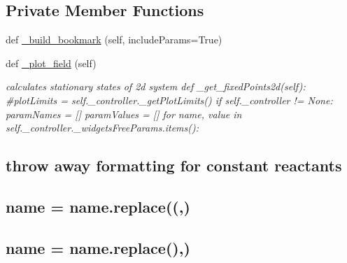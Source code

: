 \subsection*{Private Member Functions}
\begin{DoxyCompactItemize}
\item 
def \hyperlink{class_mu_mo_t_1_1_mu_mo_t_1_1_mu_mo_tfield_view_a5c6b66d66c612913bd40da54e1a50a83}{\+\_\+build\+\_\+bookmark} (self, include\+Params=True)
\item 
def \hyperlink{class_mu_mo_t_1_1_mu_mo_t_1_1_mu_mo_tfield_view_a50d59419298116f738a98c864afb9d89}{\+\_\+plot\+\_\+field} (self)
\begin{DoxyCompactList}\small\item\em calculates stationary states of 2d system def \+\_\+get\+\_\+fixed\+Points2d(self)\+: \#plot\+Limits = self.\+\_\+controller.\+\_\+get\+Plot\+Limits() if self.\+\_\+controller != None\+: param\+Names = \mbox{[}\mbox{]} param\+Values = \mbox{[}\mbox{]} for name, value in self.\+\_\+controller.\+\_\+widgets\+Free\+Params.\+items()\+: \subsection*{throw away formatting for constant reactants}

\subsection*{name = name.\+replace(\textquotesingle{}(\textquotesingle{},\textquotesingle{}\textquotesingle{})}

\subsection*{name = name.\+replace(\textquotesingle{})\textquotesingle{},\textquotesingle{}\textquotesingle{})}


\end{DoxyCompactList}
\end{DoxyCompactItemize}
